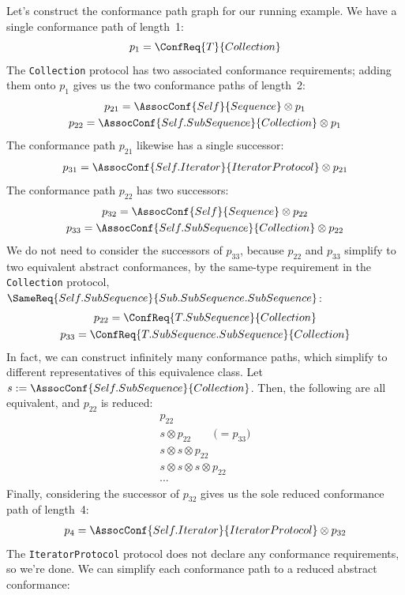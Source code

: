 \documentclass[../generics]{subfiles}
\begin{document}
Let's construct the conformance path graph for our running example. We have a single conformance path of length~1:
\[p_1 = \ConfReq{T}{Collection}\]
The \texttt{Collection} protocol has two associated conformance requirements; adding them onto $p_1$ gives us the two conformance paths of length~2:
\begin{gather*}
p_{21} = \AssocConf{Self}{Sequence}\otimes p_1\\
p_{22} = \AssocConf{Self.SubSequence}{Collection}\otimes p_1
\end{gather*}
The conformance path $p_{21}$ likewise has a single successor:
\begin{gather*}
p_{31} = \AssocConf{Self.Iterator}{IteratorProtocol} \otimes p_{21}
\end{gather*}
The conformance path $p_{22}$ has two successors:
\begin{gather*}
p_{32} = \AssocConf{Self}{Sequence}\otimes p_{22}\\
p_{33} = \AssocConf{Self.SubSequence}{Collection}\otimes p_{22}
\end{gather*}
We do not need to consider the successors of $p_{33}$, because $p_{22}$ and $p_{33}$ simplify to two equivalent abstract conformances, by the same-type requirement  in the \texttt{Collection} protocol, $\SameReq{Self.SubSequence}{Sub.SubSequence.SubSequence}$:
\begin{gather*}
p_{22}=\ConfReq{T.SubSequence}{Collection}\\
p_{33}=\ConfReq{T.SubSequence.SubSequence}{Collection}
\end{gather*}
In fact, we can construct infinitely many conformance paths, which simplify to different representatives of this equivalence class. Let $s:=\AssocConf{Self.SubSequence}{Collection}$. Then, the following are all equivalent, and $p_{22}$ is reduced:
\begin{gather*}
p_{22}\\
s\otimes p_{22}\qquad\mbox{($= p_{33}$)}\\
s\otimes s\otimes p_{22}\\
s\otimes s\otimes s\otimes p_{22}\\
\cdots
\end{gather*}
Finally, considering the successor of $p_{32}$ gives us the sole reduced conformance path of length~4:
\begin{gather*}
p_4 = \AssocConf{Self.Iterator}{IteratorProtocol} \otimes p_{32}
\end{gather*}
The \texttt{IteratorProtocol} protocol does not declare any conformance requirements, so we're done. We can simplify each conformance path to a reduced abstract conformance:
\end{document}
